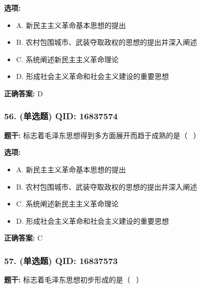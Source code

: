 \documentclass[12pt,UTF8]{ctexart}
\begin{document}
\textbf{选项:}
\begin{itemize}[leftmargin=*]

  \item A. 新民主主义革命基本思想的提出

  \item B. 农村包围城市、武装夺取政权的思想的提出并深入阐述

  \item C. 系统阐述新民主主义革命理论

  \item D. 形成社会主义革命和社会主义建设的重要思想

\end{itemize}

\textbf{正确答案:}
D

\vspace{0.3em}\hrulefill\vspace{0.7em}

\subsubsection*{56. (单选题) \small QID: 16837574}

\textbf{题干:}
标志着毛泽东思想得到多方面展开而趋于成熟的是（  ）

\textbf{选项:}
\begin{itemize}[leftmargin=*]

  \item A. 新民主主义革命基本思想的提出

  \item B. 农村包围城市、武装夺取政权的思想的提出并深入阐述

  \item C. 系统阐述新民主主义革命理论

  \item D. 形成社会主义革命和社会主义建设的重要思想

\end{itemize}

\textbf{正确答案:}
C

\vspace{0.3em}\hrulefill\vspace{0.7em}

\subsubsection*{57. (单选题) \small QID: 16837573}

\textbf{题干:}
标志着毛泽东思想初步形成的是（  ）
\end{document}

